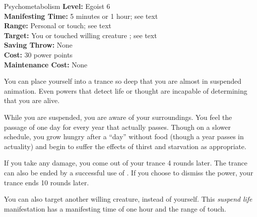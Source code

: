 {Psychometabolism}
{
	\textbf{Level:}
	Egoist 6\\
	\textbf{Manifesting Time:}
	5 minutes or 1 hour; see text\\
	\textbf{Range:}
	Personal or touch; see text\\
	\textbf{Target:}
	You or touched willing creature ; see text\\
	\textbf{Saving Throw:}
	None\\
	\textbf{Cost:}
	30 power points\\
	\textbf{Maintenance Cost:}
	None\\
}
{
	You can place yourself into a trance so deep that you are almost in suspended animation. Even powers that detect life or thought are incapable of determining that you are alive.

	While you are suspended, you are aware of your surroundings. You feel the passage of one day for every year that actually passes. Though on a slower schedule, you grow hungry after a ``day'' without food (though a year passes in actuality) and begin to suffer the effects of thirst and starvation as appropriate.

	If you take any damage, you come out of your trance 4 rounds later. The trance can also be ended by a successful use of . If you choose to dismiss the power, your trance ends 10 rounds later.

	You can also target another willing creature, instead of yourself. This \emph{suspend life} manifestation has a manifesting time of one hour and the range of touch. 
}
